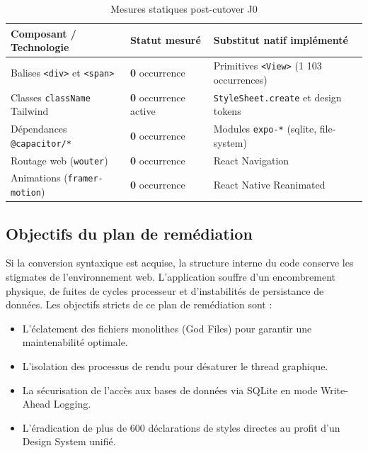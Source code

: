 \documentclass[11pt, a4paper]{article}
\begin{document}
\begin{table}[htbp]
\centering
\caption{Mesures statiques post-cutover J0}
\label{tab:metrics_dom}
\begin{tabularx}{\textwidth}{@{}lXl@{}}
\toprule
\textbf{Composant / Technologie} & \textbf{Statut mesuré} & \textbf{Substitut natif implémenté} \\ \midrule
Balises \texttt{<div>} et \texttt{<span>} & \textbf{0} occurrence & Primitives \texttt{<View>} (1 103 occurrences) \\
Classes \texttt{className} Tailwind & \textbf{0} occurrence active & \texttt{StyleSheet.create} et design tokens \\
Dépendances \texttt{@capacitor/*} & \textbf{0} occurrence & Modules \texttt{expo-*} (sqlite, file-system) \\
Routage web (\texttt{wouter}) & \textbf{0} occurrence & React Navigation \\
Animations (\texttt{framer-motion}) & \textbf{0} occurrence & React Native Reanimated \\ \bottomrule
\end{tabularx}
\end{table}

\subsection{Objectifs du plan de remédiation}
Si la conversion syntaxique est acquise, la structure interne du code conserve les stigmates de l'environnement web. L'application souffre d'un encombrement physique, de fuites de cycles processeur et d'instabilités de persistance de données. Les objectifs stricts de ce plan de remédiation sont :
\begin{itemize}
    \item L'éclatement des fichiers monolithes (God Files) pour garantir une maintenabilité optimale.
    \item L'isolation des processus de rendu pour désaturer le thread graphique.
    \item La sécurisation de l'accès aux bases de données via SQLite en mode Write-Ahead Logging.
    \item L'éradication de plus de 600 déclarations de styles directes au profit d'un Design System unifié.
\end{itemize}

\newpage

\end{document}
